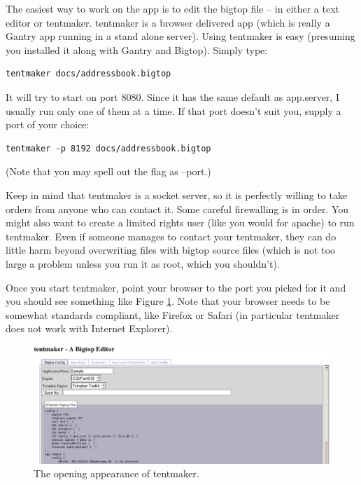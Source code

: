 The easiest way to work on the app is to edit the bigtop file -- in either
a text editor or tentmaker.  tentmaker is a browser delivered
app (which is really a Gantry app running in a stand alone server).
Using tentmaker is easy (presuming you installed it along with Gantry and
Bigtop).  Simply type:

\begin{verbatim}
tentmaker docs/addressbook.bigtop
\end{verbatim}

It will try to start on port 8080.  Since it has the same default as
app.server, I usually run only one of them at a time.  If that port doesn't
suit you, supply a port of your choice:

\begin{verbatim}
tentmaker -p 8192 docs/addressbook.bigtop
\end{verbatim}

(Note that you may spell out the flag as --port.)

Keep in mind that tentmaker is a socket server, so it is perfectly willing
to take orders from anyone who can contact it.  Some careful firewalling
is in order.  You might also want to create a limited rights user (like
you would for apache) to run tentmaker.  Even if someone manages to contact
your tentmaker, they can do little harm beyond overwriting files with bigtop
source files (which is not too large a problem unless you run it as root,
which you shouldn't).

Once you start tentmaker, point your browser to the port you picked for it
and you should see something like Figure \ref{fig:tentopening}.  Note that
your browser needs to be somewhat standards compliant, like Firefox or
Safari (in particular tentmaker does not work with Internet Explorer).

\begin{figure}
\includegraphics[width=6in]{tentopening}
\caption{The opening appearance of tentmaker.}
\label{fig:tentopening}
\end{figure}

